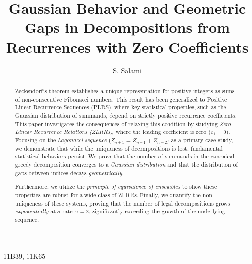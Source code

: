 \documentclass[11pt]{amsart}
\theoremstyle{plain}
\numberwithin{equation}{section} %
\numberwithin{table}{section} %
\numberwithin{figure}{section}
\begin{document}
	
	
	\setcounter{page}{1}
	
	\title[Gaussian Behavior and Geometric Gaps ...]{Gaussian Behavior and Geometric Gaps in Decompositions from Recurrences with Zero Coefficients}
	
\author{S. Salami}
\address{Institute of Mathematics and Statistics, Rio de Janeiro State University, Maracanã, Rio de Janeiro, 20950-000, RJ, Brazil}
	\maketitle
	
	
	
	\begin{abstract}
		Zeckendorf's theorem establishes a unique representation for positive integers as sums of non-consecutive Fibonacci numbers. This result has been generalized to Positive Linear Recurrence Sequences (PLRS), where key statistical properties, such as the Gaussian distribution of summands, depend on strictly positive recurrence coefficients. This paper investigates the consequences of relaxing this condition by studying \textit{Zero Linear Recurrence Relations (ZLRRs)}, where the leading coefficient is zero ($c_1=0$). 
		Focusing on the \textit{Lagonacci sequence} ($Z_{n+1}=Z_{n-1}+Z_{n-2}$) as a primary case study, we demonstrate that while the uniqueness of decompositions is lost, fundamental statistical behaviors persist. We prove that the number of summands in the canonical greedy decomposition converges to a \textit{Gaussian distribution} and that the distribution of gaps between indices decays \textit{geometrically}. 
		
		Furthermore, we utilize the \textit{principle of equivalence of ensembles} to show these properties are robust for a wide class of ZLRRs. Finally, we quantify the non-uniqueness of these systems, proving that the number of legal decompositions grows \textit{exponentially} at a rate $\alpha =2$, significantly exceeding the growth of the underlying sequence.
	\end{abstract}
	
	
		 11B39, 11K65
		
\end{document}
